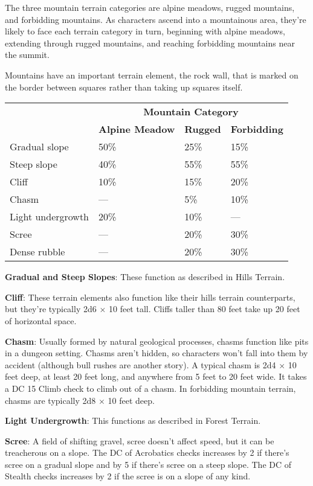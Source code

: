 				
The three mountain terrain categories are alpine meadows, rugged mountains, and forbidding mountains. As characters ascend into a mountainous area, they're likely to face each terrain category in turn, beginning with alpine meadows, extending through rugged mountains, and reaching forbidding mountains near the summit.
				
Mountains have an important terrain element, the rock wall, that is marked on the border between squares rather than taking up squares itself. 
								
\begin{tabular}{llll}
 & \multicolumn{3}{c}{\textbf{Mountain Category}}\\
 & \textbf{Alpine Meadow} & \textbf{Rugged} & \textbf{Forbidding} \\
Gradual slope & 50\% & 25\% & 15\%\\
Steep slope & 40\% & 55\% & 55\%\\
Cliff & 10\% & 15\% & 20\%\\
Chasm & --- & 5\% & 10\%\\
Light undergrowth & 20\% & 10\% & ---\\
Scree & --- & 20\% & 30\%\\
Dense rubble & --- & 20\% & 30\% \\
\end{tabular}
				
\textbf{Gradual and Steep Slopes}: These function as described in Hills Terrain.
				
\textbf{Cliff}: These terrain elements also function like their hills terrain counterparts, but they're typically 2d6 \mbox{$\times$} 10 feet tall. Cliffs taller than 80 feet take up 20 feet of horizontal space.
				
\textbf{Chasm}: Usually formed by natural geological processes, chasms function like pits in a dungeon setting. Chasms aren't hidden, so characters won't fall into them by accident (although bull rushes are another story). A typical chasm is 2d4 \mbox{$\times$} 10 feet deep, at least 20 feet long, and anywhere from 5 feet to 20 feet wide. It takes a DC 15 Climb check to climb out of a chasm. In forbidding mountain terrain, chasms are typically 2d8 \mbox{$\times$} 10 feet deep.
				
\textbf{Light Undergrowth}: This functions as described in Forest Terrain.
				
\textbf{Scree}: A field of shifting gravel, scree doesn't affect speed, but it can be treacherous on a slope. The DC of Acrobatics checks increases by 2 if there's scree on a gradual slope and by 5 if there's scree on a steep slope. The DC of Stealth checks increases by 2 if the scree is on a slope of any kind.
				
